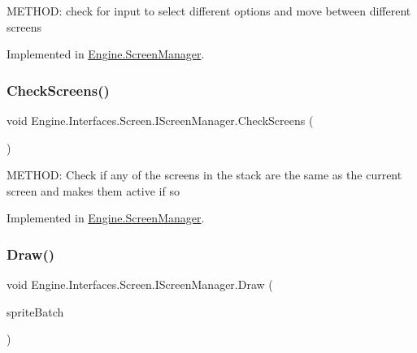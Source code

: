M\+E\+T\+H\+OD\+: check for input to select different options and move between different screens 



Implemented in \hyperlink{a00538_aa8e3ecdc7ae78094b07af944c31f90a9}{Engine.\+Screen\+Manager}.

\mbox{\label{a00470_a40fbf0a98c186ba93837f6279ad2f7dd}} 
\subsubsection{\texorpdfstring{Check\+Screens()}{CheckScreens()}}
{\footnotesize\ttfamily void Engine.\+Interfaces.\+Screen.\+I\+Screen\+Manager.\+Check\+Screens (\begin{DoxyParamCaption}{ }\end{DoxyParamCaption})}



M\+E\+T\+H\+OD\+: Check if any of the screens in the stack are the same as the current screen and makes them active if so 



Implemented in \hyperlink{a00538_abe1bf121b368a6d205706da54d949ace}{Engine.\+Screen\+Manager}.

\mbox{\label{a00470_a28a87245d63c8df1634598b3d20a14cf}} 
\subsubsection{\texorpdfstring{Draw()}{Draw()}}
{\footnotesize\ttfamily void Engine.\+Interfaces.\+Screen.\+I\+Screen\+Manager.\+Draw (\begin{DoxyParamCaption}\item[{Sprite\+Batch}]{sprite\+Batch }\end{DoxyParamCaption})}



